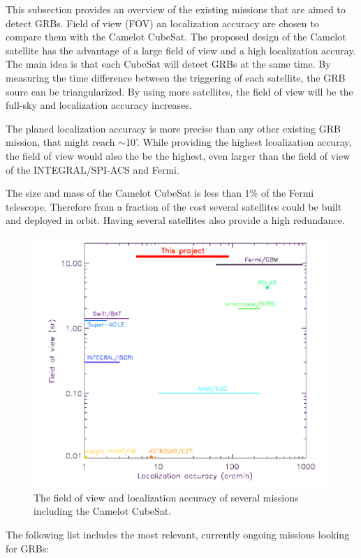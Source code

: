 \documentclass[12pt, a4paper,titlepage]{article}
\numberwithin{equation}{section}
\numberwithin{figure}{section}
\begin{document}
This subsection provides an overview of the existing missions that are aimed to detect GRBs. Field of view (FOV) an localization accuracy are chosen to compare them with the Camelot CubeSat. The proposed design of the Camelot satellite has the advantage of a large field of view and a high localization accuray. The main idea is that each CubeSat will detect GRBs at the same time. By measuring the time difference between the triggering of each satellite, the GRB soure can be triangularized. By using more satellites, the field of view will be the full-sky and localization accuracy increases.

The planed localization accuracy is more precise than any other existing GRB mission, that might reach $\sim$10'. While providing the highest lcoalization accuray, the field of view would also the be the highest, even larger than the field of view of the INTEGRAL/SPI-ACS and Fermi.

The size and mass of the Camelot CubeSat is less than 1\% of the Fermi telescope. Therefore from a fraction of the cost several satellites could be built and deployed in orbit. Having several satellites also provide a high redundance.

\begin{figure}[H]
\centering
\includegraphics[width=130.0mm]{images/fovvsloc.png}
\caption{The field of view and localization accuracy of several missions including the Camelot CubeSat.}
\end{figure}

The following list includes the most relevant, currently ongoing missions looking for GRBs:
\end{document}

